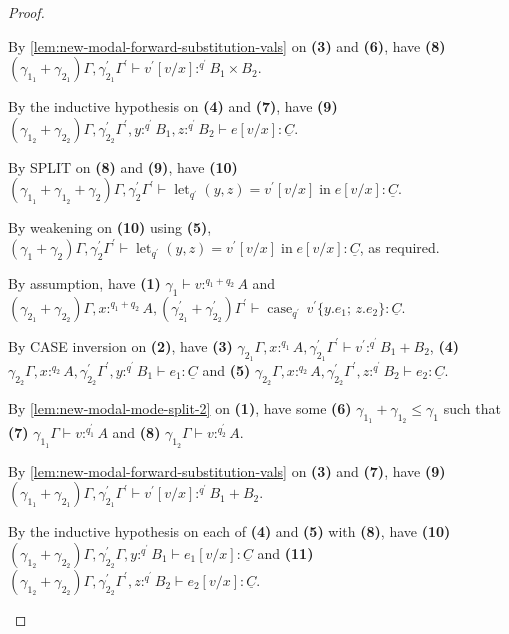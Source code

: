 \documentclass[acmsmall,screen,nonacm]{acmart}
\DeclareMathOperator{\llet}{\text{let}}
\DeclareMathOperator{\lin}{\text{in}}
\DeclareMathOperator{\case}{\text{case}}
\newcommand{\tee}{\vdash}
\begin{document}
\begin{proof}
\begin{description}
    By \ref{lem:new-modal-forward-substitution-vals} on \textbf{(3)} and \textbf{(6)}, have \textbf{(8)} $(\gamma_{1_1} + \gamma_{2_1})\Gamma, \gamma_{2_1}^\prime\Gamma^\prime \tee v^\prime[v/x] :^{q^\prime} B_1 \times B_2$. 

    By the inductive hypothesis on \textbf{(4)} and \textbf{(7)}, have \textbf{(9)} $(\gamma_{1_2} + \gamma_{2_2})\Gamma, \gamma_{2_2}^\prime\Gamma^\prime, y :^{q^\prime} B_1, z :^{q^\prime} B_2 \tee e[v/x] : \underline{C}$.

    By SPLIT on \textbf{(8)} and \textbf{(9)}, have \textbf{(10)} $(\gamma_{1_1} + \gamma_{1_2} + \gamma_2)\Gamma, \gamma_2^\prime\Gamma^\prime \tee \llet_{q^\prime} (y, z) = v^\prime[v/x] \lin e[v/x] : \underline{C}$.

    By weakening on \textbf{(10)} using \textbf{(5)}, $(\gamma_1 + \gamma_2)\Gamma, \gamma_2^\prime\Gamma^\prime \tee \llet_{q^\prime} (y, z) = v^\prime[v/x] \lin e[v/x] : \underline{C}$, as required.
    \\
    \item[Case CASE.]
    By assumption, have \textbf{(1)} $\gamma_1 \tee v :^{q_1 + q_2} A$ and $(\gamma_{2_1} + \gamma_{2_2})\Gamma, x :^{q_1 + q_2} A, (\gamma_{2_1}^\prime + \gamma_{2_2}^\prime)\Gamma^\prime \tee \case_{q^\prime} \, v^\prime \{y.e_1; \, z.e_2\} : \underline{C}$.

    By CASE inversion on \textbf{(2)}, have \textbf{(3)} $\gamma_{2_1}\Gamma, x :^{q_1} A, \gamma_{2_1}^\prime\Gamma^\prime \tee v^\prime :^{q^\prime} B_1 + B_2$, \textbf{(4)} $\gamma_{2_2}\Gamma, x :^{q_2} A, \gamma_{2_2}^\prime\Gamma^\prime, y :^{q^\prime} B_1 \tee e_1 : \underline{C}$ and \textbf{(5)} $\gamma_{2_2}\Gamma, x :^{q_2} A, \gamma_{2_2}^\prime\Gamma^\prime, z :^{q^\prime} B_2 \tee e_2 : \underline{C}$.

    By \ref{lem:new-modal-mode-split-2} on \textbf{(1)}, have some \textbf{(6)} $\gamma_{1_1} + \gamma_{1_2} \le \gamma_1$ such that \textbf{(7)} $\gamma_{1_1}\Gamma \tee v :^{q_1^\prime} A$ and \textbf{(8)} $\gamma_{1_2}\Gamma \tee v :^{q_2^\prime} A$.
    
    By \ref{lem:new-modal-forward-substitution-vals} on \textbf{(3)} and \textbf{(7)}, have \textbf{(9)} $(\gamma_{1_1} + \gamma_{2_1})\Gamma, \gamma_{2_1}^\prime\Gamma^\prime \tee v^\prime[v/x] :^{q^\prime} B_1 + B_2$. 

    By the inductive hypothesis on each of \textbf{(4)} and \textbf{(5)} with \textbf{(8)}, have \textbf{(10)} $(\gamma_{1_2} + \gamma_{2_2})\Gamma, \gamma_{2_2}^\prime\Gamma, y :^{q^\prime} B_1 \tee e_1[v/x] : \underline{C}$ and \textbf{(11)} $(\gamma_{1_2} + \gamma_{2_2})\Gamma, \gamma_{2_2}^\prime\Gamma^\prime, z :^{q^\prime} B_2 \tee e_2[v/x] : \underline{C}$.


\end{description}
\end{proof}
\end{document}
